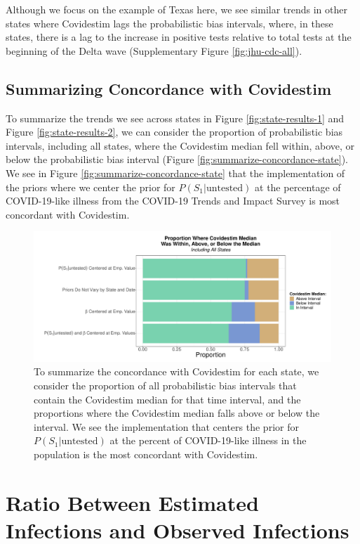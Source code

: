 \documentclass[12pt,twoside]{smiththesis}
\begin{document}
Although we focus on the example of Texas here, we see similar trends in other states where Covidestim lags the probabilistic bias intervals, where, in these states, there is a lag to the increase in positive tests relative to total tests at the beginning of the Delta wave (Supplementary Figure \ref{fig:jhu-cdc-all}).

\hypertarget{summarizing-concordance-with-covidestim}{%
\subsection{Summarizing Concordance with Covidestim}\label{summarizing-concordance-with-covidestim}}

To summarize the trends we see across states in Figure \ref{fig:state-results-1} and Figure \ref{fig:state-results-2}, we can consider the proportion of probabilistic bias intervals, including all states, where the Covidestim median fell within, above, or below the probabilistic bias interval (Figure \ref{fig:summarize-concordance-state}). We see in Figure \ref{fig:summarize-concordance-state} that the implementation of the priors where we center the prior for \(P(S_1|\text{untested})\) at the percentage of COVID-19-like illness from the COVID-19 Trends and Impact Survey is most concordant with Covidestim.
\begin{figure}
\includegraphics[width=1\linewidth]{figure/covidestim_concordance_state} \caption{\label{fig:summarize-concordance-state} To summarize the concordance with Covidestim for each state, we consider the proportion of all probabilistic bias intervals that contain the Covidestim median for that time interval, and the proportions where the Covidestim median falls above or below the interval. We see the implementation that centers the prior for $P(S_1|\text{untested})$ at the percent of COVID-19-like illness in the population is the most concordant with Covidestim.}\label{fig:unnamed-chunk-11}
\end{figure}
\hypertarget{ratio-between-estimated-infections-and-observed-infections}{%
\section{Ratio Between Estimated Infections and Observed Infections}\label{ratio-between-estimated-infections-and-observed-infections}}
\end{document}
